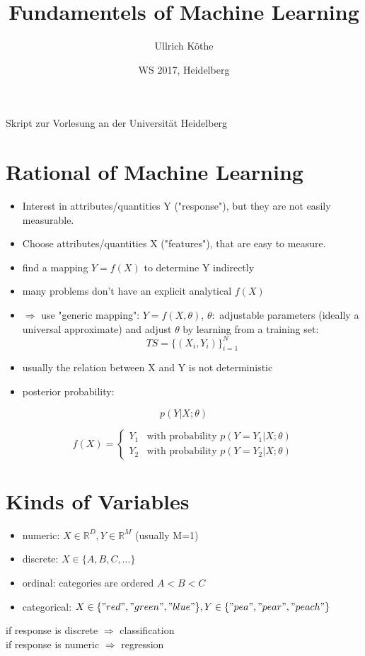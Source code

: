 \documentclass[11pt]{article}
\title{Fundamentels of Machine Learning}
\author{Ullrich Köthe}
\date{WS 2017, Heidelberg}
\begin{document}
  \maketitle
  \vspace{25mm}
  \begin{center}
    Skript zur Vorlesung an der Universität Heidelberg
  \end{center}
  \newpage

  \tableofcontents
  \newpage
  \section*{Rational of Machine Learning}
    \begin{itemize}
      \item Interest in attributes/quantities Y ("response"), but they are not easily measurable.
      \item Choose attributes/quantities X ("features"), that are easy to measure.
      \item find a mapping $Y = f(X)$ to determine Y indirectly
      \item many problems don't have an explicit analytical $f(X)$
      \item $\Rightarrow$ use "generic mapping": $Y = f(X, \theta)$, $\theta:$ adjustable parameters (ideally a universal approximate) and adjust $\theta$ by learning from a training set:
      \begin{equation*}
        TS = \{(X_{i}, Y_{i})\}_{i=1}^{N}
      \end{equation*}
      \item usually the relation between X and Y is not deterministic
      \item posterior probability:
    \end{itemize}
    \begin{equation*}
      p(Y|X;\theta)
    \end{equation*}

    \begin{equation*}
    f(X) = \begin{cases}
    Y_{1} &\text{with probability $p(Y=Y_{1}|X;\theta)$}\\
    Y_{2} &\text{with probability $p(Y=Y_{2}|X;\theta)$}
    \end{cases}
    \end{equation*}

  \section*{Kinds of Variables}
    \begin{itemize}
      \item numeric: $X \in \mathbb{R}^D, Y \in \mathbb{R}^M$ (usually M=1)
      \item discrete: $X \in \{ A, B, C,... \}$
      \item ordinal: categories are ordered $A < B < C$
      \item categorical: $X \in \{"red", "green", "blue" \}, Y \in \{"pea", "pear", "peach" \}$
    \end{itemize}
    if response is discrete $\Rightarrow$ classification \\
    if response is numeric $\Rightarrow$ regression
\end{document}
